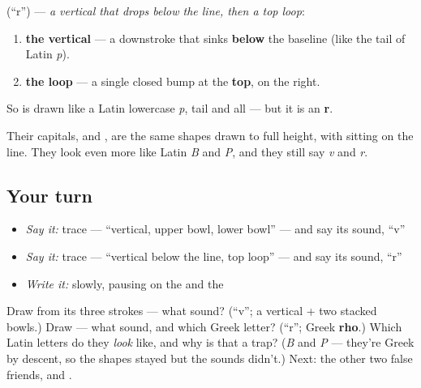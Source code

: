 \textbf{} (\textquotedblleft{}r\textquotedblright{}) — \emph{a vertical that drops below the line, then a top loop}:

\begin{enumerate}
\raggedright
  \item \textbf{the vertical} — a downstroke that sinks \textbf{below} the baseline (like the tail of Latin \emph{p}).
  \item \textbf{the loop} — a single closed bump at the \textbf{top}, on the right.
\end{enumerate}

So \textbf{} is drawn like a Latin lowercase \emph{p}, tail and all — but it is an \textbf{r}.

Their capitals, \textbf{} and \textbf{}, are the same shapes drawn to full height, with \textbf{} sitting on the line. They look even more like Latin \emph{B} and \emph{P}, and they still say \emph{v} and \emph{r}.

\subsection*{Your turn}
\begin{itemize}
\raggedright
  \item \emph{Say it:} trace  — \textquotedblleft{}vertical, upper bowl, lower bowl\textquotedblright{} — and say its sound, \textquotedblleft{}v\textquotedblright{}
  \item \emph{Say it:} trace  — \textquotedblleft{}vertical below the line, top loop\textquotedblright{} — and say its sound, \textquotedblleft{}r\textquotedblright{}
  \item \emph{Write it:} \emph{} slowly, pausing on the  and the 
\end{itemize}

\begin{tcolorbox}[breakable,colback=teal!4,colframe=teal!35!black,title={Before you move on}]
Draw \textbf{} from its three strokes — what sound? (\textquotedblleft{}v\textquotedblright{}; a vertical + two stacked bowls.) Draw \textbf{} — what sound, and which Greek letter? (\textquotedblleft{}r\textquotedblright{}; Greek \textbf{rho}.) Which Latin letters do they \emph{look} like, and why is that a trap? (\emph{B} and \emph{P} — they're Greek by descent, so the shapes stayed but the sounds didn't.) Next: the other two false friends, \textbf{} and \textbf{}.
\end{tcolorbox}
